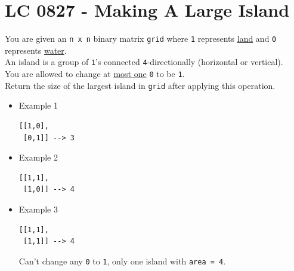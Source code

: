 \section{LC 0827 - Making A Large Island}
You are given an {\colorbox{CodeBackground}{\lstinline|n x n|}} binary matrix {\colorbox{CodeBackground}{\lstinline|grid|}} where {\colorbox{CodeBackground}{\lstinline|1|}} represents \ul{land} and {\colorbox{CodeBackground}{\lstinline|0|}} represents \ul{water}. \\

An island is a group of {\colorbox{CodeBackground}{\lstinline|1|}}'s connected {\colorbox{CodeBackground}{\lstinline|4|}}-directionally (horizontal or vertical).\\

You are allowed to change at \ul{most one} {\colorbox{CodeBackground}{\lstinline|0|}} to be {\colorbox{CodeBackground}{\lstinline|1|}}. \\

Return the size of the largest island in {\colorbox{CodeBackground}{\lstinline|grid|}} after applying this operation.

\begin{itemize}
\item Example 1
\begin{lstlisting}
[[1,0],
 [0,1]] --> 3
\end{lstlisting}
\item Example 2
\begin{lstlisting}
[[1,1],
 [1,0]] --> 4
\end{lstlisting}
\item Example 3
\begin{lstlisting}
[[1,1],
 [1,1]] --> 4
\end{lstlisting}
Can't change any {\colorbox{CodeBackground}{\lstinline|0|}} to {\colorbox{CodeBackground}{\lstinline|1|}}, only one island with {\colorbox{CodeBackground}{\lstinline|area = 4|}}.
\end{itemize}

